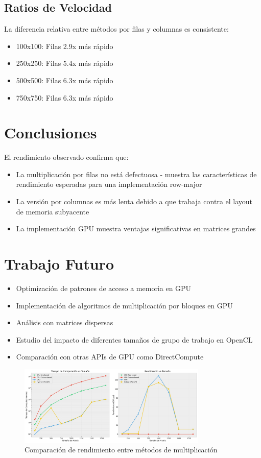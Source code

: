 \documentclass[11pt]{article}
\begin{document}
\subsection{Ratios de Velocidad}
La diferencia relativa entre métodos por filas y columnas es consistente:
\begin{itemize}
    \item 100x100: Filas 2.9x más rápido
    \item 250x250: Filas 5.4x más rápido
    \item 500x500: Filas 6.3x más rápido
    \item 750x750: Filas 6.3x más rápido
\end{itemize}

\section{Conclusiones}
El rendimiento observado confirma que:
\begin{itemize}
    \item La multiplicación por filas no está defectuosa - muestra las características de rendimiento esperadas para una implementación row-major
    \item La versión por columnas es más lenta debido a que trabaja contra el layout de memoria subyacente
    \item La implementación GPU muestra ventajas significativas en matrices grandes
\end{itemize}

\section{Trabajo Futuro}
\begin{itemize}
    \item Optimización de patrones de acceso a memoria en GPU
    \item Implementación de algoritmos de multiplicación por bloques en GPU
    \item Análisis con matrices dispersas
    \item Estudio del impacto de diferentes tamaños de grupo de trabajo en OpenCL
    \item Comparación con otras APIs de GPU como DirectCompute
\end{itemize}

\begin{figure}[h]
    \centering
    \includegraphics[width=0.8\textwidth]{grafica.png}
    \caption{Comparación de rendimiento entre métodos de multiplicación}
\end{figure}
\end{document}
